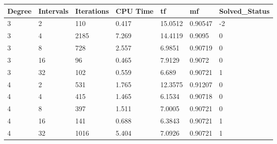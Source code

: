 \begin{tabular}{lllllll}
Degree & Intervals & Iterations & CPU Time & tf & mf & Solved_Status \\ 
\hline 
3 & 2 & 110 & 0.417 & 15.0512 & 0.90547 & -2 \\ 
3 & 4 & 2185 & 7.269 & 14.4119 & 0.9095 & 0 \\ 
3 & 8 & 728 & 2.557 & 6.9851 & 0.90719 & 0 \\ 
3 & 16 & 96 & 0.465 & 7.9129 & 0.9072 & 0 \\ 
3 & 32 & 102 & 0.559 & 6.689 & 0.90721 & 1 \\ 
4 & 2 & 531 & 1.765 & 12.3575 & 0.91207 & 0 \\ 
4 & 4 & 415 & 1.465 & 6.1534 & 0.90718 & 0 \\ 
4 & 8 & 397 & 1.511 & 7.0005 & 0.90721 & 0 \\ 
4 & 16 & 141 & 0.688 & 6.3843 & 0.90721 & 1 \\ 
4 & 32 & 1016 & 5.404 & 7.0926 & 0.90721 & 1 \\ 
\hline 
\end{tabular}